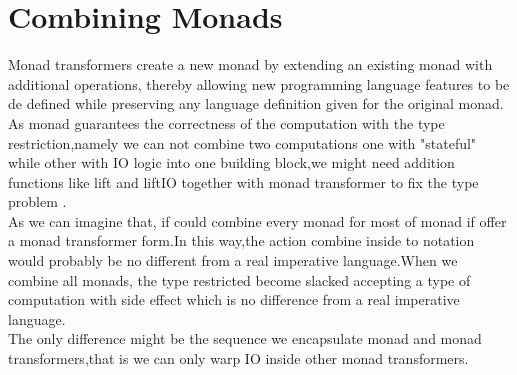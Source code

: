 \section{Combining Monads}
Monad transformers create a new monad by extending an existing monad with additional operations, thereby allowing new programming language features to be de defined while preserving any language definition given for the original monad.\cite{modular} \\ 

As monad guarantees the correctness of the computation with the type restriction,namely we can not combine two computations one with "stateful" while other with IO logic into one building block,we might need addition functions like lift and liftIO together with monad transformer to fix the type problem .\\


As we can imagine that, if could combine every monad for most of monad if offer a monad transformer form.In this way,the action combine inside to notation would probably be no different from a real imperative language.When we combine all monads, the type restricted become slacked accepting a type of computation with side effect which is no difference from a real imperative language.\\

The only difference might be the sequence we encapsulate monad and monad transformers,that is we can only warp IO inside other monad transformers.
